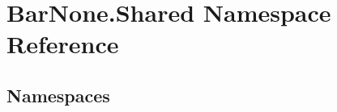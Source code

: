 \hypertarget{namespace_bar_none_1_1_shared}{}\section{Bar\+None.\+Shared Namespace Reference}
\label{namespace_bar_none_1_1_shared}
\subsection*{Namespaces}
\begin{DoxyCompactItemize}
\end{DoxyCompactItemize}
